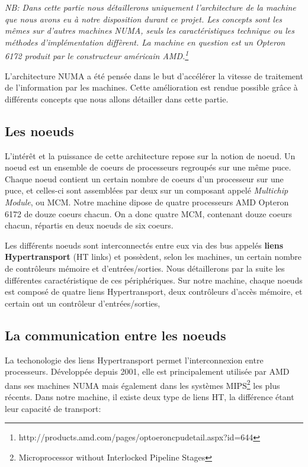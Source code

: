     \textit{NB: Dans cette partie nous détaillerons uniquement l'architecture de
      la machine que nous avons eu à notre disposition durant ce projet. Les
      concepts sont les mêmes sur d'autres machines NUMA, seuls les
      caractéristiques technique ou les méthodes d'implémentation diffèrent. La
      machine en question est un Opteron 6172 produit par le constructeur
      américain
      AMD.\footnote{http://products.amd.com/pages/optoeroncpudetail.aspx?id=644}\newline}


    L'architecture NUMA a été pensée dans le but d'accélérer la vitesse de
    traitement de l'information par les machines. Cette amélioration est rendue
    possible grâce à différents concepts que nous allons détailler dans cette
    partie.


  \subsection{Les noeuds}

    L'intérêt et la puissance de cette architecture repose sur la notion de \og
    noeud\fg. Un noeud est un ensemble de coeurs de processeurs regroupés sur
    une même puce. Chaque noeud contient un certain nombre de coeurs d'un
    processeur sur une puce, et celles-ci sont assemblées par deux sur un
    composant appelé \textit{Multichip Module}, ou MCM. Notre machine dipose de
    quatre processeurs AMD Opteron 6172 de douze coeurs chacun. On a donc quatre
    MCM, contenant douze coeurs chacun, répartis en deux noeuds de six coeurs.

    Les différents noeuds sont interconnectés entre eux via des bus appelés
    \textbf{liens Hypertransport} (HT links) et possèdent, selon les machines,
    un certain nombre de contrôleurs mémoire et d'entrées/sorties. Nous
    détaillerons par la suite les différentes caractéristique de ces
    périphériques. Sur notre machine, chaque noeuds est composé de quatre liens
    Hypertransport, deux contrôleurs d'accès mémoire, et certain ont un
    contrôleur d'entrées/sorties,



  \subsection{La communication entre les noeuds}

    La techonologie des liens Hypertransport permet l'interconnexion entre
    processeurs. Développée depuis 2001, elle est principalement utilisée par
    AMD dans ses machines NUMA mais également dans les systèmes
    MIPS\footnote{Microprocessor without Interlocked Pipeline Stages} les plus
    récents. Dans notre machine, il existe deux type de liens HT, la différence
    étant leur capacité de transport:

